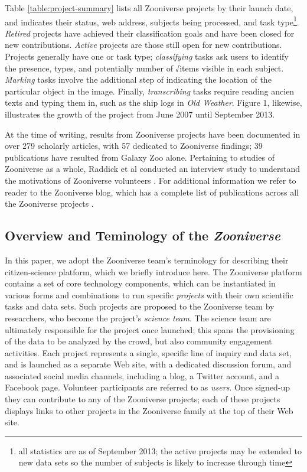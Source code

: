 \documentclass{sigchi}
\begin{document}
Table \ref{table:project-summary} lists all Zooniverse projects by their launch date, and indicates their status, web address, subjects being processed, and task type\footnote{all statistics are as of September 2013; the active projects may be extended to new data sets so the number of subjects is likely to increase through time}. \emph{Retired} projects have achieved their classification goals and have been closed for new contributions. \emph{Active} projects are those still open for new contributions.  Projects generally have one or task type; \emph{classifying} tasks ask users to identify the presence, types, and potentially number of √items visible in each subject.  \emph{Marking} tasks involve the additional step of indicating the location of the particular object in the image.  Finally, \emph{transcribing} tasks require reading ancien texts and typing them in, such as the ship logs in \emph{Old Weather}. Figure 1, likewise, illustrates the growth of the project from June 2007 until September 2013.  

At the time of writing, results from Zooniverse projects have been documented in over 279 scholarly articles, with 57  dedicated to Zooniverse findings; 39 publications have resulted from Galaxy Zoo alone.  Pertaining to studies of Zooniverse as a whole, Raddick et al conducted an interview study to understand the motivations of Zooniverse volunteers \cite{raddick2010galaxy}. For additional information we refer to reader to the Zooniverse blog, which has a complete list of publications across all the Zooniverse projects \cite{zooniverseblog}.

\subsection{Overview and Teminology of the \emph{Zooniverse}}
In this paper, we adopt the Zooniverse team's terminology for describing their citizen-science platform, which we briefly introduce here. The Zooniverse platform contains a set of core technology components, which can be instantiated in various forms and combinations to run specific \emph{projects} with their own scientific tasks and data sets. Such projects are proposed to the Zooniverse team by researchers, who become the project's \emph{science team}.  The science team are ultimately responsible for the project once launched; this spans the provisioning of the data to be analyzed by the crowd, but also community engagement activities. Each project represents a single, specific line of inquiry and data set, and is launched as a separate Web site, with a dedicated discussion forum,  and associated social media channels, including a blog, a Twitter account, and a Facebook page.  Volunteer participants are referred to as \emph{users}. Once signed-up they can contribute to any of the Zooniverse projects; each of these projects displays links to other projects in the Zooniverse family at the top of their Web site.
\end{document}
